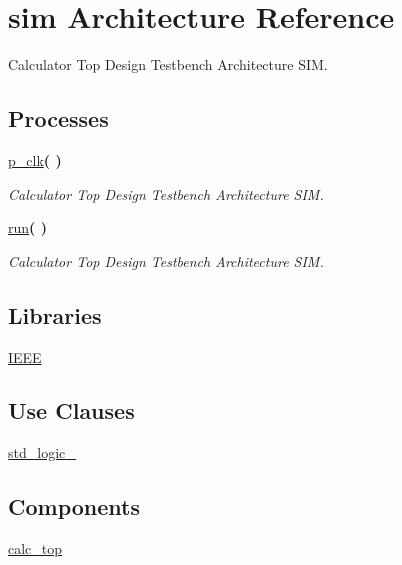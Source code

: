 \hypertarget{classtb__calc__top_1_1sim}{}\section{sim Architecture Reference}
\label{classtb__calc__top_1_1sim}


Calculator Top Design Testbench Architecture S\+IM.  


\subsection*{Processes}
 \begin{DoxyCompactItemize}
\item 
\hyperlink{classtb__calc__top_1_1sim_af35c81fcf5e4601a4e5d669b422cf79a}{p\+\_\+clk}{\bfseries  (  )}
\begin{DoxyCompactList}\small\item\em Calculator Top Design Testbench Architecture S\+IM. \end{DoxyCompactList}\item 
\hyperlink{classtb__calc__top_1_1sim_a0f40b896b2461e250ebafd4e27b8ff54}{run}{\bfseries  (  )}
\begin{DoxyCompactList}\small\item\em Calculator Top Design Testbench Architecture S\+IM. \end{DoxyCompactList}\end{DoxyCompactItemize}
\subsection*{Libraries}
 \begin{DoxyCompactItemize}
\item 
\hyperlink{classtb__calc__top_1_1sim_ae4f03c286607f3181e16b9aa12d0c6d4}{I\+E\+EE} 
\end{DoxyCompactItemize}
\subsection*{Use Clauses}
 \begin{DoxyCompactItemize}
\item 
\hyperlink{classtb__calc__top_1_1sim_acd03516902501cd1c7296a98e22c6fcb}{std\+\_\+logic\+\_}   
\end{DoxyCompactItemize}
\subsection*{Components}
 \begin{DoxyCompactItemize}
\item 
\hyperlink{classtb__calc__top_1_1sim_a687da4cbd84662d6303d7967eac03adf}{calc\+\_\+top}  {\bfseries }  
\end{DoxyCompactItemize}
